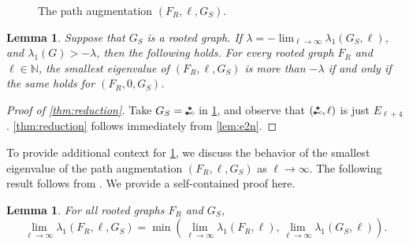 \documentclass[11pt]{article}
\newtheorem{lemma}[theorem]{Lemma}
\theoremstyle{definition}
\theoremstyle{remark}
\newcommand{\la}{\lambda}
\newcommand{\N}{\mathbb{N}}
\newcommand{\etwo}{\tikz[baseline=-0.2ex, scale=0.9]{\draw[darkgray, thick] (0,0)--(0.2,0); \draw[darkgray, fill=darkgray] (0,0) circle (0.05); \draw[darkgray, fill=darkgray] (0.1,0.17320508075) circle (0.05); \draw[darkgray, fill=white] (0.2,0) circle (0.05);}}
\begin{document}
\begin{figure}
    \centering
    \caption{The path augmentation $(F_R, \ell, G_S)$.} \label{fig:fr-l-gs}
\end{figure}

\begin{lemma} \label{lem:reduction-gen}
    Suppose that $G_S$ is a rooted graph. If $\la = -\lim_{\ell \to \infty} \la_1(G_S,\ell)$, and $\la_1(G) > -\la$, then the following holds. For every rooted graph $F_R$ and $\ell \in \N$, the smallest eigenvalue of $(F_R, \ell, G_S)$ is more than $-\la$ if and only if the same holds for $(F_R, 0, G_S)$.
\end{lemma}

\begin{proof}[Proof of \cref{thm:reduction}]
    Take $G_S = \etwo$ in \cref{lem:reduction-gen}, and observe that $(\etwo, \ell)$ is just $E_{\ell+4}$. \cref{thm:reduction} follows immediately from \cref{lem:e2n}.
\end{proof}

To provide additional context for \cref{lem:reduction-gen}, we discuss the behavior of the smallest eigenvalue of the path augmentation $(F_R, \ell, G_S)$ as $\ell \to \infty$. The following result follows from \cite[Proposition~3.5]{BB24}. We provide a self-contained proof here.

\begin{lemma} \label{lem:limit}
    For all rooted graphs $F_R$ and $G_S$, \[\lim_{\ell \to \infty}\la_1(F_R, \ell, G_S) = \min\left(\lim_{\ell \to \infty}\la_1(F_R, \ell), \lim_{\ell \to \infty}\la_1(G_S, \ell)\right).\]
\end{lemma}
\end{document}
